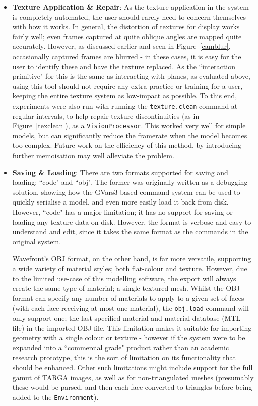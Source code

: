\documentclass[a4paper,10pt]{article}
\begin{document}
\begin{itemize}
\item{\textbf{Texture Application \& Repair}: As the texture application in the system is completely automated, the user should rarely need to concern themselves with how it works. In general, the distortion of textures for display works fairly well; even frames captured at quite oblique angles are mapped quite accurately. However, as discussed earlier and seen in Figure~\ref{camblur}, occasionally captured frames are blurred - in these cases, it is easy for the user to identify these and have the texture replaced. As the ``interaction primitive" for this is the same as interacting with planes, as evaluated above, using this tool should not require any extra practice or training for a user, keeping the entire texture system as low-impact as possible. To this end, experiments were also run with running the \texttt{texture.clean} command at regular intervals, to help repair texture discontinuities (as in Figure~\ref{texclean}), as a \texttt{VisionProcessor}. This worked very well for simple models, but can significantly reduce the framerate when the model becomes too complex. Future work on the efficiency of this method, by introducing further memoisation may well alleviate the problem.
}

\item{\textbf{Saving \& Loading}: There are two formats supported for saving and loading; ``code" and ``obj". The former was originally written as a debugging solution, showing how the GVars3-based command system can be used to quickly serialise a model, and even more easily load it back from disk. However, ``code" has a major limitation; it has no support for saving or loading any texture data on disk. However, the format is verbose and easy to understand and edit, since it takes the same format as the commands in the original system.

Wavefront's OBJ format, on the other hand, is far more versatile, supporting a wide variety of material styles; both flat-colour and texture. However, due to the limited use-case of this modelling software, the export will always create the same type of material; a single textured mesh. Whilst the OBJ format can specify any number of materials to apply to a given set of faces (with each face receiving at most one material), the \texttt{obj.load} command will only support one; the last specified material and material database (MTL file) in the imported OBJ file. This limitation makes it suitable for importing geometry with a single colour or texture - however if the system were to be expanded into a ``commercial grade" product rather than an academic research prototype, this is the sort of limitation on its functionality that should be enhanced. Other such limitations might include support for the full gamut of TARGA images, as well as for non-triangulated meshes (presumably these would be parsed, and then each face converted to triangles before being added to the \texttt{Environment}).
 }
\end{itemize}
\end{document}
